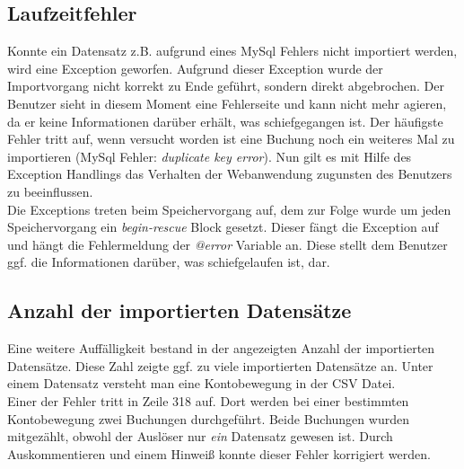 \documentclass[12pt,             %
               a4paper,          %
               listof=totoc,     %
               index=totoc,      %
               bibliography=totoc,%
               oneside,         %
               BCOR1cm,          %
               english   %
               ]{scrbook}
\begin{document}
\subsection{Laufzeitfehler}
Konnte ein Datensatz z.B. aufgrund eines MySql Fehlers nicht importiert werden, wird eine Exception geworfen. Aufgrund dieser Exception wurde der Importvorgang nicht korrekt zu Ende geführt, sondern direkt abgebrochen. Der Benutzer sieht in diesem Moment eine Fehlerseite und kann nicht mehr agieren, da er keine Informationen darüber erhält, was schiefgegangen ist. Der häufigste Fehler tritt auf, wenn versucht worden ist eine Buchung noch ein weiteres Mal zu importieren (MySql Fehler: \textit{duplicate key error}). Nun gilt es mit Hilfe des Exception Handlings das Verhalten der Webanwendung zugunsten des Benutzers zu beeinflussen.\\

Die Exceptions treten beim Speichervorgang auf, dem zur Folge wurde um jeden Speichervorgang ein \textit{begin-rescue} Block gesetzt. Dieser fängt die Exception auf und hängt die Fehlermeldung der \textit{@error} Variable an. Diese stellt dem Benutzer ggf. die Informationen darüber, was schiefgelaufen ist, dar.\\

\label{listing:webimport_nil}


\subsection{Anzahl der importierten Datensätze}
Eine weitere Auffälligkeit bestand in der angezeigten Anzahl der importierten Datensätze. Diese Zahl zeigte ggf. zu viele importierten Datensätze an. Unter einem Datensatz versteht man eine Kontobewegung in der CSV Datei.\\

Einer der Fehler tritt in Zeile 318 auf. Dort werden bei einer bestimmten Kontobewegung zwei Buchungen durchgeführt. Beide Buchungen wurden mitgezählt, obwohl der Auslöser nur \textit{ein} Datensatz gewesen ist. Durch Auskommentieren und einem Hinweiß konnte dieser Fehler korrigiert werden.\\

\label{listing:webimport_nil}
\end{document}
